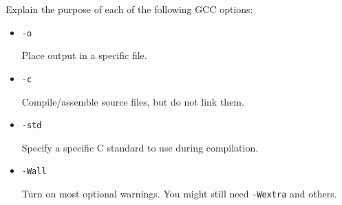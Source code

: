 Explain the purpose of each of the following GCC options:
\begin{itemize}
	\item \texttt{-o}	\hspace{20mm}
		\begin{answer}
		Place output in a specific file.
		\end{answer}
	\item \texttt{-c}	\hspace{20mm}
		\begin{answer}
		Compile/assemble source files, but do not link them.
		\end{answer}
	\item \texttt{-std}	\hspace{16mm}
		\begin{answer}
		Specify a specific C standard to use during compilation.
		\end{answer}
	\item \texttt{-Wall}	\hspace{14mm}
		\begin{answer}
		Turn on most optional warnings. You might still need \texttt{-Wextra} and others.
		\end{answer}

\end{itemize}
